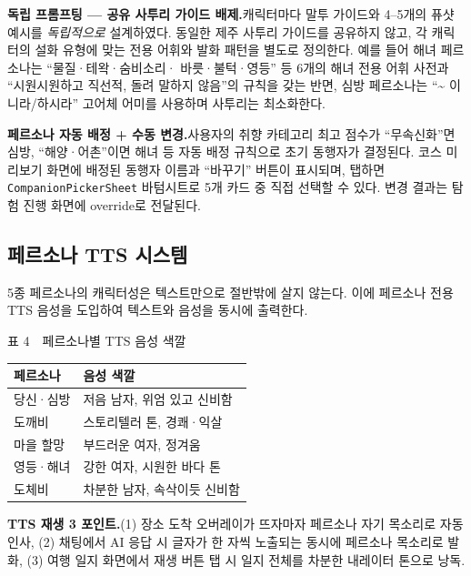 \documentclass[10pt,twocolumn,a4paper]{article}
\begin{document}
\textbf{독립 프롬프팅 --- 공유 사투리 가이드 배제.}\quad 캐릭터마다 말투
가이드와 4--5개의 퓨샷 예시를 \emph{독립적으로} 설계하였다. 동일한 제주
사투리 가이드를 공유하지 않고, 각 캐릭터의 설화 유형에 맞는 전용 어휘와
발화 패턴을 별도로 정의한다. 예를 들어 해녀 페르소나는 ``물질·테왁·숨비소리·
바릇·불턱·영등'' 등 6개의 해녀 전용 어휘 사전과 ``시원시원하고 직선적,
돌려 말하지 않음''의 규칙을 갖는 반면, 심방 페르소나는 ``\textasciitilde
이니라/하시라'' 고어체 어미를 사용하며 사투리는 최소화한다.

\textbf{페르소나 자동 배정 + 수동 변경.}\quad 사용자의 취향 카테고리 최고
점수가 ``무속신화''면 심방, ``해양·어촌''이면 해녀 등 자동 배정 규칙으로
초기 동행자가 결정된다. 코스 미리보기 화면에 배정된 동행자 이름과
``바꾸기'' 버튼이 표시되며, 탭하면 \texttt{CompanionPickerSheet} 바텀시트로
5개 카드 중 직접 선택할 수 있다. 변경 결과는 탐험 진행 화면에 override로
전달된다.

\subsection{페르소나 TTS 시스템}

5종 페르소나의 캐릭터성은 텍스트만으로 절반밖에 살지 않는다. 이에 페르소나
전용 TTS 음성을 도입하여 텍스트와 음성을 동시에 출력한다.

\begin{table}[H]
\centering
{\small 표 4~~페르소나별 TTS 음성 색깔}
\label{tab:tts-voice}
\vspace{2pt}

\footnotesize
\begin{tabularx}{\columnwidth}{lX}
\toprule
페르소나 & 음성 색깔 \\
\midrule
당신·심방 & 저음 남자, 위엄 있고 신비함 \\
도깨비   & 스토리텔러 톤, 경쾌·익살 \\
마을 할망 & 부드러운 여자, 정겨움 \\
영등·해녀 & 강한 여자, 시원한 바다 톤 \\
도체비   & 차분한 남자, 속삭이듯 신비함 \\
\bottomrule
\end{tabularx}
\end{table}

\textbf{TTS 재생 3 포인트.}\quad (1) 장소 도착 오버레이가 뜨자마자 페르소나
자기 목소리로 자동 인사, (2) 채팅에서 AI 응답 시 글자가 한 자씩 노출되는
동시에 페르소나 목소리로 발화, (3) 여행 일지 화면에서 재생 버튼 탭 시
일지 전체를 차분한 내레이터 톤으로 낭독.
\end{document}
